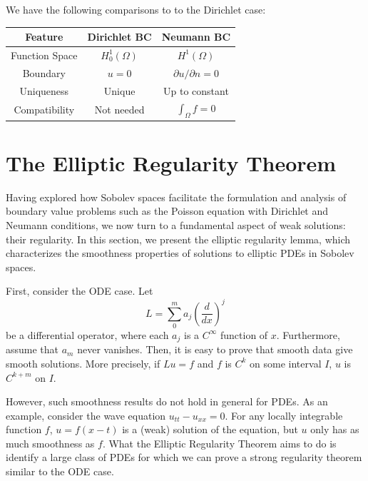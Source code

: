 \documentclass[12pt,letterpaper,reqno]{article}
\newcommand\Tstrut{\rule{0pt}{3ex}}         %
\theoremstyle{plain}                              %
\theoremstyle{definition}                         %
\theoremstyle{remark}                             %
\numberwithin{equation}{section}
\begin{document}
We have the following comparisons to to the Dirichlet case:

\begin{center}
\begin{tabular}{ccc}
\toprule
\textbf{Feature} & \textbf{Dirichlet BC} & \textbf{Neumann BC} \\ [0.5ex]
\hline
Function Space & $H_0^1(\Omega)$ & $H^1(\Omega)$\Tstrut \\ [1ex]
Boundary & $u = 0$ & $\partial u/\partial n = 0$ \\ [1ex]
Uniqueness & Unique & Up to constant \\ [1ex]
Compatibility & Not needed & $\int_\Omega f = 0$ \\ [1ex]
\bottomrule
\end{tabular}
\end{center}

\section{The Elliptic Regularity Theorem}
Having explored how Sobolev spaces facilitate the formulation and analysis of boundary value problems such as the Poisson equation with Dirichlet and Neumann conditions, we now turn to a fundamental aspect of weak solutions: their regularity. In this section, we present the elliptic regularity lemma, which characterizes the smoothness properties of solutions to elliptic PDEs in Sobolev spaces.

First, consider the ODE case. Let \[L= \sum_0^m a_j\left(\frac d{dx}\right)^j\] be a differential operator, where each $a_j$ is a $C^\infty$ function of $x$. Furthermore, assume that $a_m$ never vanishes. Then, it is easy to prove that smooth data give smooth solutions. More precisely, if $Lu=f$ and $f$ is $C^k$ on some interval $I$, $u$ is $C^{k+m}$ on $I$.

However, such smoothness results do not hold in general for PDEs. As an example, consider the wave equation $u_{tt}-u_{xx}=0$. For any locally integrable function $f$, $u=f(x-t)$ is a (weak) solution of the equation, but $u$ only has as much smoothness as $f$. What the Elliptic Regularity Theorem aims to do is identify a large class of PDEs for which we can prove a strong regularity theorem similar to the ODE case.
\end{document}
